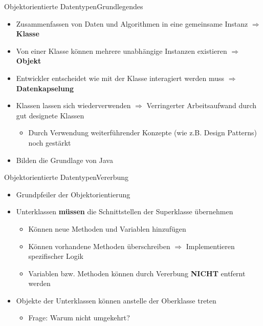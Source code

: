 \begin{frame}{Objektorientierte Datentypen}{Grundlegendes}
	\begin{itemize}
		\item Zusammenfassen von Daten und Algorithmen in eine gemeinsame Instanz $\Rightarrow$ \textbf{Klasse}
		\item Von einer Klasse können mehrere unabhängige Instanzen existieren $\Rightarrow$ \textbf{Objekt}
		\item Entwickler entscheidet wie mit der Klasse interagiert werden muss $\Rightarrow$ \textbf{Datenkapselung}
		\item Klassen lassen sich wiederverwenden $\Rightarrow$ Verringerter Arbeitsaufwand durch gut designete Klassen
		\begin{itemize}
			\item Durch Verwendung weiterführender Konzepte (wie z.B. Design Patterns) noch gestärkt
		\end{itemize}
		\item Bilden die Grundlage von Java
	\end{itemize}
\end{frame}

\begin{frame}{Objektorientierte Datentypen}{Vererbung}
	\begin{itemize}
		\item Grundpfeiler der Objektorientierung
		\item Unterklassen \textbf{müssen} die Schnittstellen der Superklasse übernehmen
		\begin{itemize}
			\item Können neue Methoden und Variablen hinzufügen
			\item Können vorhandene Methoden überschreiben $\Rightarrow$ Implementieren spezifischer Logik
			\item Variablen bzw. Methoden können durch Vererbung \textbf{NICHT} entfernt werden
		\end{itemize}
		\item Objekte der Unterklassen können anstelle der Oberklasse treten
		\begin{itemize}
			\item Frage: Warum nicht umgekehrt?
		\end{itemize}
	\end{itemize}
\end{frame}


